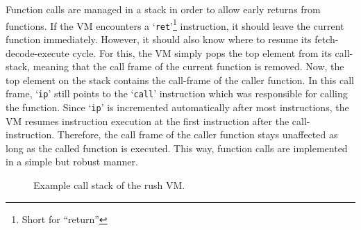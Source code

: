 Function calls are managed in a stack in order to allow early returns from functions.
If the VM encounters a `\texttt{ret}'\footnote{Short for \enquote{return}} instruction, it should leave the current function immediately.
However, it should also know where to resume its fetch-decode-execute cycle.
For this, the VM simply pops the top element from its call-stack, meaning that the call frame of the current function is removed.
Now, the top element on the stack contains the call-frame of the caller function.
In this call frame, `\texttt{ip}' still points to the `\texttt{call}' instruction which was responsible for calling the function.
Since `\texttt{ip}' is incremented automatically after most instructions, the VM resumes instruction execution at the first instruction after the call-instruction.
Therefore, the call frame of the caller function stays unaffected as long as the called function is executed.
This way, function calls are implemented in a simple but robust manner.

\begin{wrapfigure}{L}{.4\textwidth}
	\centering
	\caption{Example call stack of the rush VM.}\label{fig:rush_vm_call_stack}
\end{wrapfigure}


